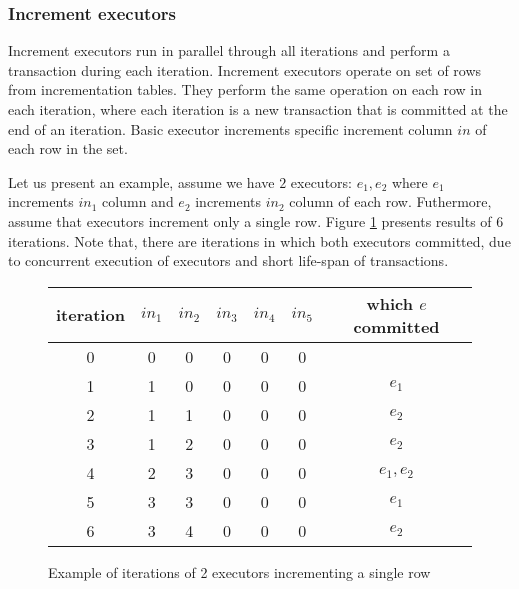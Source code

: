 \subsubsection{Increment executors}
Increment executors run in parallel through all iterations and perform a transaction during each iteration.
Increment executors operate on set of rows from incrementation tables. They perform the same operation on each row in each iteration, where each iteration is a new transaction that is committed at the end of an iteration. 
Basic executor increments specific increment column $in$ of each row in the set.

Let us present an example, assume we have $2$ executors: $e_1, e_2$ where $e_1$ increments $in_1$ column and $e_2$ increments $in_2$ column of each row. Futhermore, assume that executors increment only a single row. Figure \ref{fig:executorsExample} presents results of $6$ iterations. Note that, there are iterations in which both executors committed, due to concurrent execution of executors and short life-span of transactions.


\begin{figure}[h]
\centering
\begin{tabular}{c||c|c|c|c|c|c}
        \toprule
        iteration & $in_{1}$ & $in_{2}$ & $in_{3}$ & $in_{4}$ & $in_{5}$ & which $e$ committed \\ \midrule
        0 &         0        & 0        & 0        &  0       & 0        &    \\
        1 &         1        & 0        & 0        &  0       & 0        &   $e_1$ \\ 
        2 &         1        & 1        & 0        &  0       & 0        &   $e_2$ \\ 
        3 &         1        & 2        & 0        &  0       & 0        &   $e_2$ \\ 
        4 &         2        & 3        & 0        &  0       & 0        &   $e_1, e_2$ \\ 
        5 &         3        & 3        & 0        &  0       & 0        &   $e_1$ \\ 
        6 &         3        & 4        & 0        &  0       & 0        &   $e_2$ \\  \bottomrule
      \end{tabular}
      \caption{Example of iterations of 2 executors incrementing a single row}
  \label{fig:executorsExample}
\end{figure}

